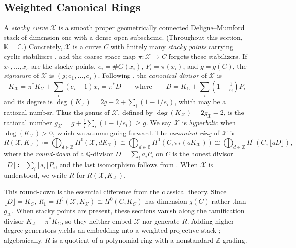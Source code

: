 \documentclass[11pt,reqno]{amsart}
\theoremstyle{remark}
\newcommand{\CC}{\mathbb{C}}
\newcommand{\KK}{\mathbb{K}}
\newcommand{\QQ}{\mathbb{Q}}
\newcommand{\ZZ}{\mathbb{Z}}
\newcommand{\cX}{\mathcal{X}}
\begin{document}
\subsection{Weighted Canonical Rings}\label{subsec:weighted-canonical}
A \emph{stacky curve} $\cX$ is a smooth proper geometrically connected Deligne--Mumford stack of dimension one with a dense open subscheme. (Throughout this section, $\KK=\CC$.) Concretely, $\cX$ is a curve $C$ with finitely many \emph{stacky points} carrying cyclic stabilizers \cite[Lem.~5.3.10]{voightZurieckBrown22}, and the coarse space map $\pi\colon \cX \to C$ forgets these stabilizers. If $x_1,\ldots,x_s$ are the stacky points, $e_i = \#G(x_i)$, $P_i = \pi(x_i)$, and $g = g(C)$, the \emph{signature} of $\cX$ is $(g;e_1,\ldots,e_s)$. Following \cite{voightZurieckBrown22}, the \emph{canonical divisor} of $\cX$ is
\begin{equation}\label{eq:floor}
	K_{\cX}=\pi^*K_C+\sum_{i}\left(e_i-1\right) x_i = \pi^*D \qquad \text{where} \qquad D=K_{C}+\sum_{i}\left(1-\tfrac{1}{e_i}\right)P_i
\end{equation}
and its degree is $\deg(K_{\cX}) = 2g-2+\sum_i(1-1/e_i)$, which may be a rational number. Thus the genus of $\cX$, defined by $\deg(K_{\cX}) = 2g_{\cX}-2$, is the rational number $g_{\cX} = g+\tfrac{1}{2}\sum_i(1-1/e_i)\geq g$. We say $\cX$ is \emph{hyperbolic} when $\deg(K_{\cX})>0$, which we assume going forward. The \emph{canonical ring} of $\cX$ is
\[
R\left(\cX,K_{\cX}\right) \coloneqq \bigoplus_{d\in \ZZ} H^0\left(\cX, dK_{\cX}\right) \cong \bigoplus_{d\in \ZZ} H^0\left(C, \pi_*(dK_{\cX})\right)  \cong \bigoplus_{d\in \ZZ} H^0\left(C, \lfloor dD \rfloor\right),
\]
where the \emph{round-down} of a $\QQ$-divisor $D=\sum_i a_iP_i$ on $C$ is the honest divisor $\lfloor D\rfloor \coloneqq \sum_i \lfloor a_i\rfloor P_i$, and the last isomorphism follows from \cite[\S~5.4]{voightZurieckBrown22}. When $\cX$ is understood, we write $R$ for $R(\cX, K_{\cX})$.

This round-down is the essential difference from the classical theory. Since $\lfloor D\rfloor=K_C$, $R_1=H^0(\cX,K_{\cX})\cong H^0(C,K_C)$ has dimension $g(C)$ rather than $g_{\cX}$. When stacky points are present, these sections vanish along the ramification divisor $K_{\cX}-\pi^*K_C$, so they neither embed $\cX$ nor generate $R$. Adding higher-degree generators yields an embedding into a weighted projective stack \cite{braggOlssonWebb24}; algebraically, $R$ is a quotient of a polynomial ring with a nonstandard $\ZZ$-grading.
\end{document}
